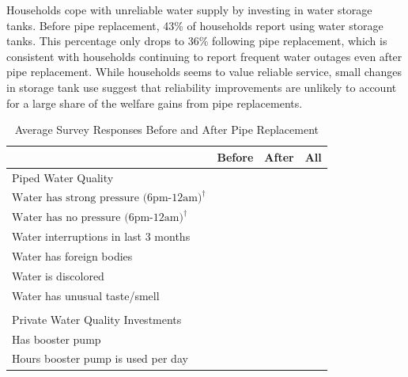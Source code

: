 \documentclass[12pt,table]{article}
\begin{document}
Households cope with unreliable water supply by investing in water storage tanks.  Before pipe replacement, 43\% of households report using water storage tanks.  This percentage only drops to 36\% following pipe replacement, which is consistent with households continuing to report frequent water outages even after pipe replacement.  While households seems to value reliable service, small changes in storage tank use suggest that reliability improvements are unlikely to account for a large share of the welfare gains from pipe replacements.

\begin{table}[h!] 
\centering
\caption{Average Survey Responses Before and After Pipe Replacement}\label{table:descriptives}
\vspace{-2mm}
\begin{threeparttable}
\begin{tabular}{@{}l*{1}{KKK}@{}}
\toprule
  & Before & After  & All \\
\midrule
Piped Water Quality \\[.5em]
\hspace{1em}$\text{Water has strong pressure (6pm-12am)}^{\dagger}$ &  \\
\hspace{1em}$\text{Water has no pressure (6pm-12am)}^{\dagger}$  &  \\
\hspace{1em}Water interruptions in last 3 months &  \\
\hspace{1em}Water has foreign bodies &  \\
\hspace{1em}Water is discolored &  \\
\hspace{1em}Water has unusual taste/smell &  \\
\\[-.5em]
Private Water Quality Investments \\[.5em]
\hspace{1em}Has booster pump &  \\
\hspace{1em}Hours booster pump is used per day &  \\

\end{tabular}
\end{threeparttable}
\end{table}
\end{document}

